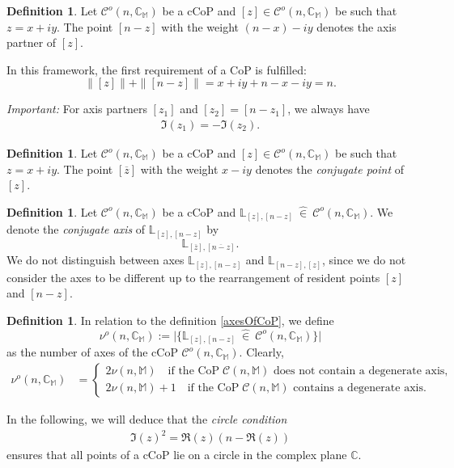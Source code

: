 \documentclass[12pt]{amsart}
\theoremstyle{definition}
\newtheorem{definition}[theorem]{Definition}
\theoremstyle{remark}
\numberwithin{equation}{section}
\newcommand{\abs}[1]{\lvert#1\rvert}
\newcommand{\inn}{~ \hat{\in}~ }
\newcommand{\C}{\mathcal{C}}
\newcommand{\CC}{\mathbb{C}}
\newcommand{\M}{\mathbb{M}}
\newcommand{\LL}{\mathbb{L}}
\begin{document}
\begin{definition}
Let $\C^o(n,\CC_{\M})$ be a cCoP and $[z]\in \C^o(n, \CC_{\M})$ be such that $z=x+iy$. The point $[n-z]$ with the weight $(n-x)-iy$ denotes the axis partner of $[z]$.
\end{definition}

In this framework, the first requirement of a CoP is fulfilled:
\[
\|[z]\|+\|[n-z]\|=x+iy+n-x-iy=n.
\]

\emph{Important:} For axis partners $[z_1]$ and $[z_2]=[n-z_1]$, we always have
\begin{align}\label{E_Im-axispartner}
\Im(z_1)=-\Im(z_2).
\end{align}

\begin{definition}
Let $\C^o(n,\CC_{\M})$ be a cCoP and $[z]\in \C^o(n, \CC_{\M})$ be such that $z=x+iy$. The point $[\overline{z}]$ with the weight $x-iy$ denotes the \emph{conjugate point} of $[z]$.
\end{definition}

\begin{definition}\label{D_conjugateAxis}
Let $\C^o(n,\CC_{\M})$ be a cCoP and $\LL_{[z],[n-z]}\inn \C^o(n, \CC_{\M})$. We denote the \emph{conjugate axis} of $\LL_{[z],[n-z]}$ by 
\[
\LL_{[\overline{z}],[\overline{n-z}]}.
\]
We do not distinguish between axes $\LL_{[z],[n-z]}$ and $\LL_{[n-z],[z]}$, since we do not consider the axes to be different up to the rearrangement of resident points $[z]$ and $[n-z]$.
\end{definition}

\begin{definition}
In relation to the definition \ref{axesOfCoP}, we define
\[
\nu^o(n,\CC_{\M}):=\abs{\{\LL_{[z],[n-z]}\inn \C^o(n, \CC_{\M})\}}
\]
as the number of axes of the cCoP $\C^o(n,\CC_{\M})$. Clearly,
\begin{align}
\nu^o(n,\CC_{\M})&= 
\begin{cases}
2\nu(n,\M)\quad \text{if the CoP} \; \C(n, \M) \text{ does not contain a degenerate axis}, \\
2\nu(n,\M) + 1 \quad \text{if the CoP} \; \C(n, \M) \text{ contains a degenerate axis}.
\end{cases}
\end{align}
\end{definition}

\noindent
In the following, we will deduce that the \emph{circle condition}
\begin{align}\label{E_spRequirement}
\Im(z)^2=\Re(z)\left(n-\Re(z)\right)
\end{align}
ensures that all points of a cCoP lie on a circle in the complex plane $\CC$.
\end{document}
